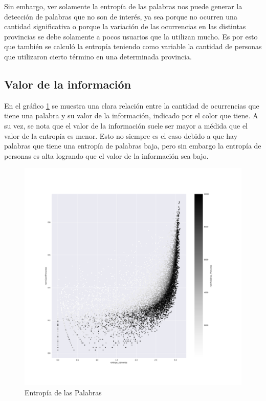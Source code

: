 Sin embargo, ver solamente la entropía de las palabras nos puede generar la detección de palabras que no son de interés, ya sea porque no ocurren una cantidad significativa o porque la variación de las ocurrencias en las distintas provincias se debe solamente a pocos usuarios que la utilizan mucho. Es por esto que también se calculó la entropía teniendo como variable la cantidad de personas que utilizaron cierto término en una determinada provincia.

\subsection{Valor de la información}
\label{sub:ValorDeLaInformacion}
En el gráfico \ref{fig:infoValue} se muestra una clara relación entre la cantidad de ocurrencias que tiene una palabra y su valor de la información, indicado por el color que tiene. A su vez, se nota que el valor de la información suele ser mayor a médida que el valor de la entropía es menor. Esto no siempre es el caso debido a que hay palabras que tiene una entropía de palabras baja, pero sin embargo la entropía de personas es alta logrando que el valor de la información sea bajo.

\begin{figure}[ht]
\centering
\includegraphics[scale=0.4]{./images/entropiaPersonasxNormCantPersonas.pdf}
\caption{Entropía de las Palabras} 
\label{fig:infoValue} 
\end{figure}

